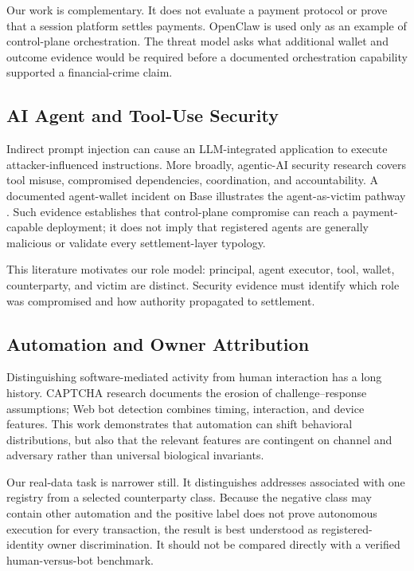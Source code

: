 Our work is complementary.  It does not evaluate a payment protocol or prove
that a session platform settles payments.  OpenClaw is used only as an example
of control-plane orchestration\cite{openclaw2026}.  The threat model asks what
additional wallet and outcome evidence would be required before a documented
orchestration capability supported a financial-crime claim.

\subsection{AI Agent and Tool-Use Security}\label{subsec:rw-aisec}

Indirect prompt injection can cause an LLM-integrated application to execute
attacker-influenced instructions\cite{greshake2023}.  More broadly, agentic-AI
security research covers tool misuse, compromised dependencies, coordination,
and accountability\cite{lazer2026agentic,unit42openclaw2026}.  A documented
agent-wallet incident on Base illustrates the agent-as-victim pathway
\cite{grokbankr2026}.  Such evidence establishes that control-plane compromise
can reach a payment-capable deployment; it does not imply that registered
agents are generally malicious or validate every settlement-layer typology.

This literature motivates our role model: principal, agent executor, tool,
wallet, counterparty, and victim are distinct.  Security evidence must identify
which role was compromised and how authority propagated to settlement.

\subsection{Automation and Owner Attribution}\label{subsec:rw-botdetect}

Distinguishing software-mediated activity from human interaction has a long
history.  CAPTCHA research documents the erosion of challenge--response
assumptions\cite{bursztein2014}; Web bot detection combines timing, interaction,
and device features\cite{iliou2021,jonker2019}.  This work demonstrates that
automation can shift behavioral distributions, but also that the relevant
features are contingent on channel and adversary rather than universal
biological invariants.

Our real-data task is narrower still.  It distinguishes addresses associated
with one registry from a selected counterparty class.  Because the negative
class may contain other automation and the positive label does not prove
autonomous execution for every transaction, the result is best understood as
registered-identity owner discrimination.  It should not be compared directly
with a verified human-versus-bot benchmark.


